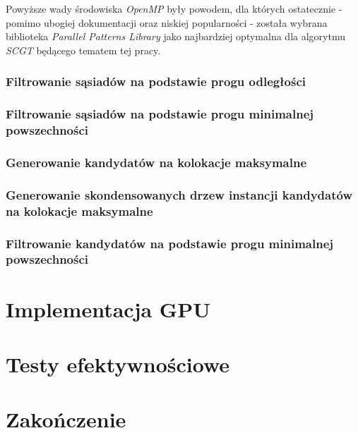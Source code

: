 \documentclass[12pt]{article}
\begin{document}
Powyższe wady środowiska \textit{OpenMP} były powodem, dla których ostatecznie - pomimo ubogiej dokumentacji oraz niskiej popularności -  została wybrana biblioteka \textit{Parallel Patterns Library} jako najbardziej optymalna dla algorytmu \textit{SCGT} będącego tematem tej pracy.

\subsubsection{Filtrowanie sąsiadów na podstawie progu odległości}
\subsubsection{Filtrowanie sąsiadów na podstawie progu minimalnej powszechności}
\subsubsection{Generowanie kandydatów na kolokacje maksymalne}
\subsubsection{Generowanie skondensowanych drzew instancji kandydatów na kolokacje maksymalne}
\subsubsection{Filtrowanie kandydatów na podstawie progu minimalnej powszechności}

\section{Implementacja GPU}

\section{Testy efektywnościowe}

\section{Zakończenie}

\newpage
\end{document}
